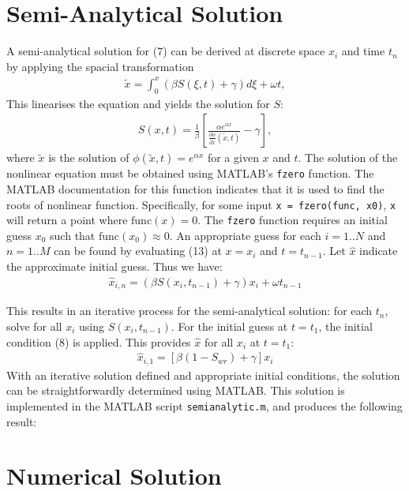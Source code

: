 \documentclass[11pt]{article}
\begin{document}
\section{Semi-Analytical Solution}
A semi-analytical solution for (7) can be derived at discrete space $x_i$ and time $t_n$ by applying the spacial transformation 
\begin{eqnarray}
\tilde x = \int_0^x (\beta S(\xi,t)+\gamma)d\xi + \omega t,
\end{eqnarray}
This linearises the equation and yields the solution for $S$:
\begin{eqnarray}
S(x,t) = \frac{1}{\beta}\left[\frac{\alpha e^{\alpha x}}{\frac{\partial\phi}{\partial\tilde x}(\tilde x,t)}-\gamma\right],
\end{eqnarray}
where $\tilde x$ is the solution of $\phi(\tilde x,t)=e^{\alpha x}$ for a given $x$ and $t$. 
The solution of the nonlinear equation must be obtained using MATLAB's \verb|fzero| function. The MATLAB documentation for this function indicates that it is used to find the roots of nonlinear function. Specifically, for some input \verb|x = fzero(func, x0)|, \verb|x| will return a point where $\text{func}(x) = 0$. The \verb|fzero| function requires an initial guess $x_0$ such that $\text{func}(x_0) \approx 0$. An appropriate guess for each $i=1..N$ and $n=1..M$ can be found by evaluating (13) at $x=x_i$ and $t=t_{n-1}$. Let $\hat x$ indicate the approximate initial guess. Thus we have:
\begin{eqnarray}
\hat x_{i,n} = \left(\beta S(x_i, t_{n-1})+\gamma\right)x_i + \omega t_{n-1}
\end{eqnarray}

This results in an iterative process for the semi-analytical solution: for each $t_n$, solve for all $x_i$ using $S(x_i,t_{n-1})$. For the initial guess at $t=t_1$, the initial condition (8) is applied. This provides $\hat x$ for all $x_i$ at $t=t_1$:
\begin{eqnarray}
\hat x_{i,1} = \left[\beta (1-S_{wr})+\gamma\right]x_i
\end{eqnarray}
With an iterative solution defined and appropriate initial conditions, the solution can be straightforwardly determined using MATLAB. This solution is implemented in the MATLAB script \verb|semianalytic.m|, and produces the following result:


\smallbreak
\section{Numerical Solution}
\end{document}
